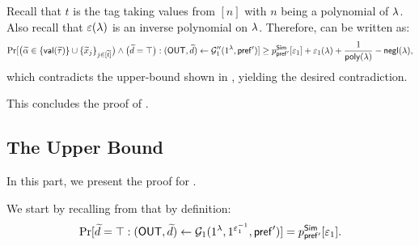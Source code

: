 Recall that $t$ is the tag taking values from $[n]$ with $n$ being a polynomial of $\lambda$. Also recall that $\varepsilon(\lambda)$ is an inverse polynomial on $\lambda$. Therefore,  can be written as:
$$\Pr[\big(\widetilde{\alpha} \in \{\mathsf{val}(\widetilde{\tau})\} \cup \{\widetilde{x}_j\}_{j \in [\widetilde{t}]}\big) \wedge \big(\widetilde{d} = \top\big):(\mathsf{OUT},\widetilde{d}) \gets \mathcal{G}_1''(1^\lambda,\mathsf{pref'})] \ge p^{\mathsf{Sim}}_{\mathsf{pref}'}[\varepsilon_1] + \varepsilon_1(\lambda)+ \frac{1}{\mathsf{poly}(\lambda)} - \mathsf{negl}(\lambda),$$
which contradicts the upper-bound shown in , yielding the desired contradiction. 


This concludes the proof of .





\subsection{The Upper Bound} 
\label{sec:G''1:upperbound} 
In this part, we present the proof for .



We start by recalling from  that by definition: 
\begin{equation}\label{G''1:upperbound:proof:eq:1}
\Pr[\widetilde{d} = \top : (\mathsf{OUT},\widetilde{d}) \gets \mathcal{G}_1{(1^\lambda, 1^{\varepsilon_1^{-1}},  \mathsf{pref}')}] = p^{\mathsf{Sim}}_{\mathsf{pref'}}{[\varepsilon_1]}.
\end{equation}

